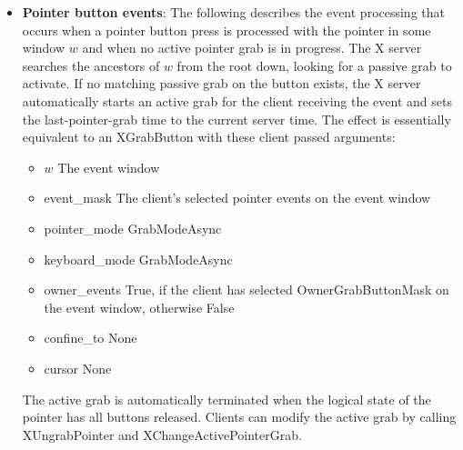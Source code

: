 \documentclass{report}
\begin{document}
\begin{itemize}
            \begin{itemize}
                \item Keyboard and pointer events
                \item Window crossing events
                \item Input focus events
                \item Keymap state notification events
                \item Exposure events
                \item Window state notification events
                \item Structure control events
                \item Colormap state notification events
                \item Client communication events
            \end{itemize}
        \item \textbf{Pointer button events}:  The following describes the event processing that occurs when a pointer button press is processed with the pointer in some window $w$ and when no active pointer grab is in progress.
            \bigbreak \noindent 
            The X server searches the ancestors of $w$ from the root down, looking for a passive grab to activate. If no matching passive grab on the button exists, the X server automatically starts an active grab for the client receiving the event and sets the last-pointer-grab time to the current server time. The effect is essentially equivalent to an XGrabButton with these client passed arguments:
            \begin{itemize}
                \item $w$ The event window
                \item event\_mask The client’s selected pointer events on the event window
                \item pointer\_mode GrabModeAsync
                \item keyboard\_mode GrabModeAsync
                \item owner\_events True, if the client has selected OwnerGrabButtonMask on the event window, otherwise False
                \item confine\_to None
                \item cursor None
            \end{itemize}
            The active grab is automatically terminated when the logical state of the pointer has all buttons released. Clients can modify the active grab by calling XUngrabPointer and XChangeActivePointerGrab.

\end{itemize}
\end{document}
